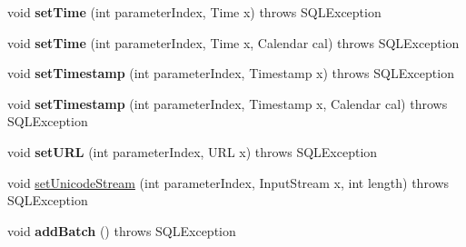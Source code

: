 \begin{DoxyCompactItemize}
void {\bfseries set\+Time} (int parameter\+Index, Time x)  throws S\+Q\+L\+Exception 
\item 
\mbox{\label{classcom_1_1mysql_1_1jdbc_1_1jdbc2_1_1optional_1_1_prepared_statement_wrapper_ab561a018ad9a96eaaea39698f4136354}} 
void {\bfseries set\+Time} (int parameter\+Index, Time x, Calendar cal)  throws S\+Q\+L\+Exception 
\item 
\mbox{\label{classcom_1_1mysql_1_1jdbc_1_1jdbc2_1_1optional_1_1_prepared_statement_wrapper_a0ac057da5f2ab33419495c8f5fd6190b}} 
void {\bfseries set\+Timestamp} (int parameter\+Index, Timestamp x)  throws S\+Q\+L\+Exception 
\item 
\mbox{\label{classcom_1_1mysql_1_1jdbc_1_1jdbc2_1_1optional_1_1_prepared_statement_wrapper_a97716a4520d7afd5c30611e78ba6aa6d}} 
void {\bfseries set\+Timestamp} (int parameter\+Index, Timestamp x, Calendar cal)  throws S\+Q\+L\+Exception 
\item 
\mbox{\label{classcom_1_1mysql_1_1jdbc_1_1jdbc2_1_1optional_1_1_prepared_statement_wrapper_a9c4a4d4f6489b1fb0908785ed53cb61e}} 
void {\bfseries set\+U\+RL} (int parameter\+Index, U\+RL x)  throws S\+Q\+L\+Exception 
\item 
void \mbox{\hyperlink{classcom_1_1mysql_1_1jdbc_1_1jdbc2_1_1optional_1_1_prepared_statement_wrapper_ae2b6da058c76a1dd1c56a5102e924f20}{set\+Unicode\+Stream}} (int parameter\+Index, Input\+Stream x, int length)  throws S\+Q\+L\+Exception 
\item 
\mbox{\label{classcom_1_1mysql_1_1jdbc_1_1jdbc2_1_1optional_1_1_prepared_statement_wrapper_a544f6be243decfa949d201f6d30c2a4f}} 
void {\bfseries add\+Batch} ()  throws S\+Q\+L\+Exception 
\item 
\mbox{\label{classcom_1_1mysql_1_1jdbc_1_1jdbc2_1_1optional_1_1_prepared_statement_wrapper_a0c52f7505f8625ef7876e507232e8232}} 

\end{DoxyCompactItemize}
